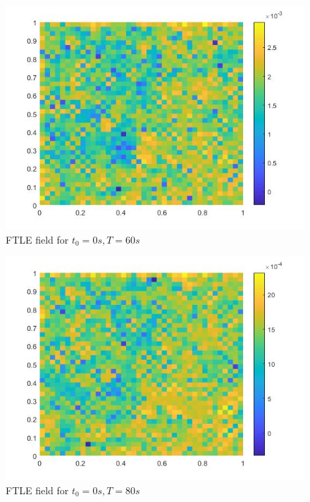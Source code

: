 \begin{figure}
    \centering
    \includegraphics[scale = 0.35]{figures/FTLE_3.jpg}
    \caption{FTLE field for $t_0 = 0s, T = 60s$}
    \label{fig:ftle3}
\end{figure}

\begin{figure}
    \centering
    \includegraphics[scale = 0.35]{figures/FTLE_4.jpg}
    \caption{FTLE field for $t_0 = 0s, T = 80s$}
    \label{fig:ftle4}
\end{figure}

